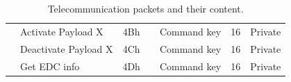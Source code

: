 \begin{landscape}
\begin{table}[ht]
\begin{tabular}{llccccc}
                                      & Activate Payload X    & 4Bh &                                     & Command key                                & 16                    & Private \\
                                      & Deactivate Payload X  & 4Ch &                                     & Command key                                & 16                    & Private \\
                                      & Get EDC info          & 4Dh &                                     & Command key                                & 16                    & Private \\
            \bottomrule[1.5pt]
        \end{tabular}
        \caption{Telecommunication packets and their content.}
        \label{tab:packets-struct}
    \end{table}
\end{landscape}

